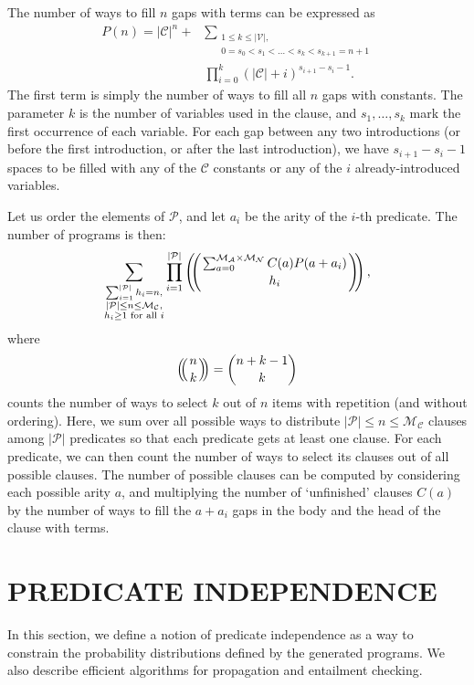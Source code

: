 \documentclass[letterpaper]{article}
\theoremstyle{definition}
\newcommand{\predicates}{\mathcal{P}}
\newcommand{\variables}{\mathcal{V}}
\newcommand{\constants}{\mathcal{C}}
\newcommand{\maxArity}{\mathcal{M}_{\mathcal{A}}}
\newcommand{\maxNumNodes}{\mathcal{M}_{\mathcal{N}}}
\newcommand{\maxNumClauses}{\mathcal{M}_{\mathcal{C}}}
\def\multiset#1#2{\ensuremath{\left(\kern-.3em\left(\genfrac{}{}{0pt}{}{#1}{#2}\right)\kern-.3em\right)}}
\begin{document}
The number of ways to fill $n$ gaps with terms can be expressed as
\begin{align*}
  P(n) = |\constants{}|^n + &\sum_{\substack{1 \le k \le |\variables{}|, \\ 0 =
      s_0 < s_1 < \dots < s_k < s_{k+1} = n+1}}\\
  &\prod_{i=0}^k (|\constants{}| + i)^{s_{i+1} - s_i - 1}.
\end{align*}
The first term is simply the number of ways to fill all $n$ gaps with
constants. The parameter $k$ is the number of variables used in the clause, and
$s_1, \dots, s_k$ mark the first occurrence of each variable. For each gap
between any two introductions (or before the first introduction, or after the last
introduction), we have $s_{i+1}-s_i-1$ spaces to be filled with any of the
$\constants{}$ constants or any of the $i$ already-introduced variables.

Let us order the elements of $\predicates{}$, and let $a_i$ be the arity of the
$i$-th predicate. The number of programs is then:
\[
  \sum_{\substack{ \sum_{i=1}^{|\predicates{}|} h_i = n,\\
      |\predicates{}| \le n \le \maxNumClauses,\\
      h_i \ge 1 \text{ for all } i}} \prod_{i=1}^{|\predicates{}|}
  \multiset{\sum_{a=0}^{\maxArity{} \times \maxNumNodes{}} C(a) P(a+a_i)}{h_i},
\]
where
\[
  \multiset{n}{k} = \binom{n+k-1}{k}
\]
counts the number of ways to select $k$ out of $n$ items with repetition (and
without ordering). Here, we sum over all possible ways to distribute
$|\predicates{}| \le n \le \maxNumClauses{}$ clauses among $|\predicates{}|$
predicates so that each predicate gets at least one clause. For each predicate,
we can then count the number of ways to select its clauses out of all possible
clauses. The number of possible clauses can be computed by considering each
possible arity $a$, and multiplying the number of `unfinished' clauses $C(a)$ by
the number of ways to fill the $a+a_i$ gaps in the body and the head of the
clause with terms.

\section{PREDICATE INDEPENDENCE}

In this section, we define a notion of predicate independence as a way to
constrain the probability distributions defined by the generated programs. We
also describe efficient algorithms for propagation and entailment checking.
\end{document}
